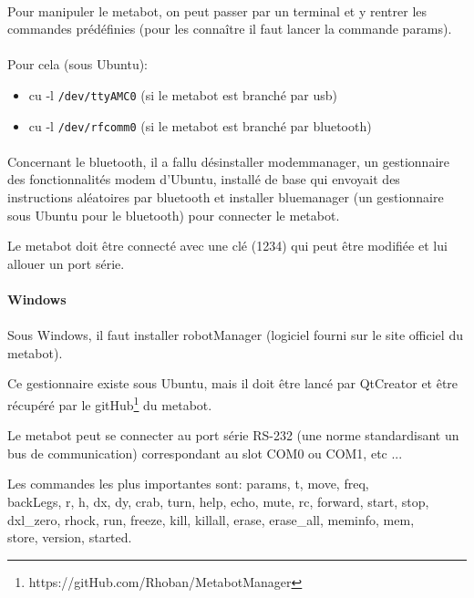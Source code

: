 \documentclass[10pt,a4paper]{report}
\begin{document}
\paragraph{}
Pour manipuler le metabot, on peut passer par un terminal et y rentrer les commandes prédéfinies (pour les connaître il faut lancer la commande params).
\paragraph{}
Pour cela (sous Ubuntu): 
\begin{itemize}
\item cu -l \texttt{/dev/ttyAMC0} (si le metabot est branché par usb)
\item cu -l \texttt{/dev/rfcomm0} (si le metabot est branché par bluetooth)
\end{itemize}
\paragraph{}
Concernant le bluetooth, il a fallu désinstaller modemmanager, un gestionnaire des fonctionnalités modem d'Ubuntu, installé de base qui envoyait des instructions aléatoires par bluetooth et installer bluemanager (un gestionnaire sous Ubuntu pour le bluetooth) pour connecter le metabot.

Le metabot doit être connecté avec une clé (1234) qui peut être modifiée et lui allouer un port série.
\paragraph{Windows}
\paragraph{}
Sous Windows, il faut installer robotManager (logiciel fourni sur le site officiel du metabot).

Ce gestionnaire existe sous Ubuntu, mais il doit être lancé par QtCreator et être récupéré par le  gitHub\footnote{https://gitHub.com/Rhoban/MetabotManager} du metabot.

Le metabot peut se connecter au port série RS-232 (une norme standardisant un bus de communication) correspondant au slot COM0 ou COM1, etc ...

Les commandes les plus importantes sont: params,  t, move, freq, \\backLegs, r, h, dx, dy, crab, turn, help, echo, mute, rc, forward, start, stop,\\ dxl\_zero, rhock, run, freeze, kill, killall, erase, erase\_all, meminfo, mem, \\store, version, started.
\end{document}
